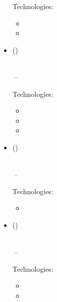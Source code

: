 \documentclass[11pt,a4paper]{article}
\begin{document}
\begin{itemize}[leftmargin=0pt,label={},itemsep=2em,topsep=0pt]
\vspace{0.2cm}
{\color{secondary}Technologies:} \UnisysTechnology
\vspace{0.3cm}
\begin{itemize}[leftmargin=*,topsep=-6pt,parsep=0pt,partopsep=0pt,itemsep=0pt]
    \item \UnisysReporting
    \item \UnisysDecisions
\end{itemize}

\item \parbox{\textwidth}{\textbf{\ACTName} {\color{secondary}\small(\ACTCompanyDescription)} \hfill \textit{\ACTLocation}}\\
\textit{\ACTJobTitle} \hfill \textit{\ACTJobStart\,--\,\ACTJobEnd}

\vspace{0.2cm}
{\color{secondary}Technologies:} \ACTTechnology
\vspace{0.3cm}
\begin{itemize}[leftmargin=*,topsep=-6pt,parsep=0pt,partopsep=0pt,itemsep=0pt]
    \item \ACTFiscal
    \item \ACTSolutions
    \item \ACTSLA
\end{itemize}

\item \parbox{\textwidth}{\textbf{\HSBCName} {\color{secondary}\small(\HSBCCompanyDescription)} \hfill \textit{\HSBCLocation}}\\
\textit{\HSBCJobTitle} \hfill \textit{\HSBCJobStart\,--\,\HSBCJobEnd}

\vspace{0.2cm}
{\color{secondary}Technologies:} \HSBCTechnology
\vspace{0.3cm}
\begin{itemize}[leftmargin=*,topsep=-6pt,parsep=0pt,partopsep=0pt,itemsep=0pt]
    \item \HSBCShort
\end{itemize}

\item \parbox{\textwidth}{\textbf{\LloydsName} {\color{secondary}\small(\LloydsCompanyDescription)} \hfill \textit{\LloydsLocation}}\\
\textit{\LloydsJobTitle} \hfill \textit{\LloydsJobStart\,--\,\LloydsJobEnd}

\vspace{0.2cm}
{\color{secondary}Technologies:} \LloydsTechnology
\vspace{0.3cm}
\begin{itemize}[leftmargin=*,topsep=-6pt,parsep=0pt,partopsep=0pt,itemsep=0pt]
    \item \LloydsProjects
    \item \LloydsFiscal
\end{itemize}


\end{itemize}
\end{document}
